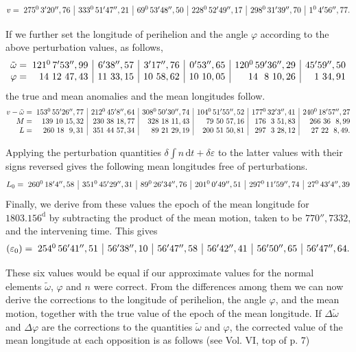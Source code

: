 \begin{landscape}
\[\begin{array}{@{}r@{\;}r|r|r|r|r|r@{}}
v={}&275^{0}\,3'20'',76 & 333^{0}\,51'47'',21 & 69^{0}\,53'48'',50 & 228^{0}\,52'49'',17 & 298^{0}\,31'39'',70 & 1^{0}\,4'56'',77.
\end{array}\]
\par
If we further set the longitude of perihelion and the angle \(\varphi\) according to the above perturbation values, as follows,
\[\begin{array}{@{}r@{\;}r|r|r|r|r|r@{}}
\tilde\omega={}&121^{0}\,7'53'',99 & 6'38'',57 & 3'17'',76 & 0'53'',65 & 120^{0}\,59'36'',29 & 45'59'',50
\\
\varphi={}&14\ 12\ 47,43 & 11\ 33,15 & 10\ 58,62 & 10\ 10,05 & 14\ \ 8\ 10,26 & 1\ 34,91
\end{array}\]
the true and mean anomalies and the mean longitudes follow.
\[\begin{array}{@{}r@{\;}r|r|r|r|r|r@{}}
v-\tilde\omega={}&153^{0}\,55'26'',77 & 212^{0}\,45'8'',64 & 308^{0}\,50'30'',74 & 104^{0}\,51'55'',52 & 177^{0}\,32'3'',41 & 240^{0}\,18'57'',27
\\
M={}&139\ 10\ 15,32 & 230\ 38\ 18,77 & 328\ 18\ 11,43 & 79\ 50\ 57,16 & 176\ \ 3\ 51,83 & 266\ 36\ \ 8,99
\\
L={}&260\ 18\ \ 9,31 & 351\ 44\ 57,34 & 89\ 21\ 29,19 & 200\ 51\ 50,81 & 297\ \ 3\ 28,12 & 27\ 22\ \ 8,49.
\end{array}\]
\par
Applying the perturbation quantities \(\delta\int n\,\mathrm{d}t+\delta\varepsilon\) to the latter values with their signs reversed gives the following mean longitudes free of perturbations.
\[\begin{array}{@{}r@{\;}r|r|r|r|r|r@{}}
L_0={}&260^{0}\,18'4'',58 & 351^{0}\,45'29'',31 & 89^{0}\,26'34'',76 & 201^{0}\,0'49'',51 & 297^{0}\,11'59'',74 & 27^{0}\,43'4'',39
\end{array}\]
Finally, we derive from these values the epoch of the mean longitude for \(1803.156^{\mathrm d}\) by subtracting the product of the mean motion, taken to be \(770'',7332\), and the intervening time. This gives
\[\begin{array}{@{}r@{\;}r|r|r|r|r|r@{}}
(\varepsilon_0)={}&254^{0}\,56'41'',51 & 56'38'',10 & 56'47'',58 & 56'42'',41 & 56'50'',65 & 56'47'',64.
\end{array}\]
\par
{}These six values would be equal if our approximate values for the normal elements \(\tilde\omega\), \(\varphi\) and \(n\) were correct. From the differences among them we can now derive the corrections to the longitude of perihelion, the angle \(\varphi\), and the mean motion, together with the true value of the epoch of the mean longitude. If \(\Delta\tilde\omega\) and \(\Delta\varphi\) are the corrections to the quantities \(\tilde\omega\) and \(\varphi\), the corrected value of the mean longitude at each opposition is as follows (see Vol. VI, top of p. 7)

\end{landscape}
